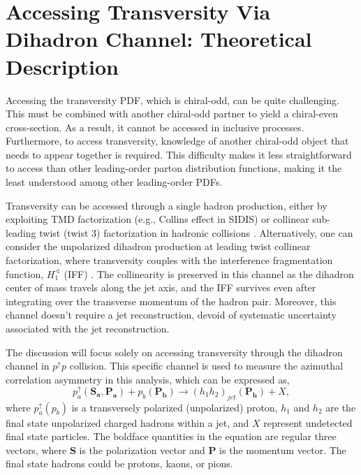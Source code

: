 \section{Accessing Transversity Via Dihadron Channel: Theoretical Description}
\label{sec:ifftheory}
 Accessing the transversity PDF, which is chiral-odd, can be quite challenging. This must be combined with another chiral-odd partner to yield a chiral-even cross-section. As a result, it cannot be accessed in inclusive processes. Furthermore, to access transversity, knowledge of another chiral-odd object that needs to appear together is required. This difficulty makes it less straightforward to access than other leading-order parton distribution functions, making it the least understood among other leading-order PDFs.

Transversity can be accessed through a single hadron production, either by exploiting TMD factorization (e.g., Collins effect \cite{Collins:1992} in SIDIS) or collinear sub-leading twist (twist 3) factorization in hadronic collisions \cite{DAlesio:2020vtw, Cammarota:2020qcw}.
 Alternatively, one can consider the unpolarized dihadron production at leading twist collinear factorization, where transversity couples with the interference fragmentation function, $H^\sphericalangle_1$ (IFF) \cite{Tang:1998wp, Jaffe:1997hf, Jaffe:1997pv, Bacchetta:2004it}.
 The collinearity is preserved in this channel as the dihadron center of mass travels along the jet axis, and the IFF survives even after integrating over the transverse momentum of the hadron pair. Moreover, this channel doesn't require a jet reconstruction, devoid of systematic uncertainty associated with the jet reconstruction.  

The discussion will focus solely on accessing transversity through the dihadron channel in $p^\uparrow p$ collision. This specific channel is used to measure the azimuthal correlation asymmetry in this analysis, which can be expressed as,
\begin{equation}
    \label{eq:dihadch}
    p^\uparrow_a(\mathbf{S_a, P_a}) + p_b (\mathbf{P_b}) \rightarrow (h_1 h_2)_{jet} (\mathbf{P_h})  + X,
\end{equation}
where $p^\uparrow_a(p_b)$ is a transversely polarized (unpolarized) proton, $h_1$ and $h_2$ are the final state unpolarized charged hadrons  within a jet, and $X$ represent undetected final state particles. The boldface quantities in the equation are regular three vectors, where $\mathbf{S}$ is the polarization vector and $\mathbf{P}$ is the momentum vector. The final state hadrons could be protons, kaons, or pions.

